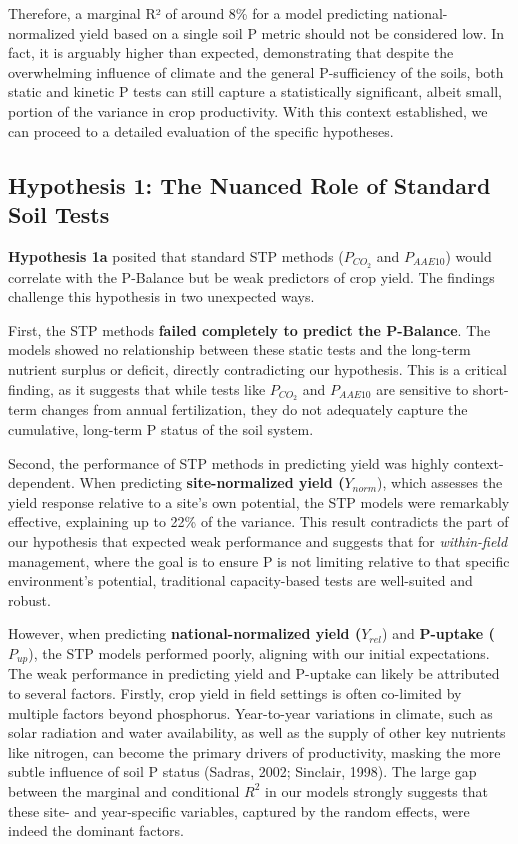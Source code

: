 \documentclass[
  a4paper,
]{article}
\begin{document}
Therefore, a marginal R² of around 8\% for a model predicting
national-normalized yield based on a single soil P metric should not be
considered low. In fact, it is arguably higher than expected,
demonstrating that despite the overwhelming influence of climate and the
general P-sufficiency of the soils, both static and kinetic P tests can
still capture a statistically significant, albeit small, portion of the
variance in crop productivity. With this context established, we can
proceed to a detailed evaluation of the specific hypotheses.

\subsection{Hypothesis 1: The Nuanced Role of Standard Soil
Tests}\label{hypothesis-1-the-nuanced-role-of-standard-soil-tests}

\textbf{Hypothesis 1a} posited that standard STP methods (\(P_{CO_2}\)
and \(P_{AAE10}\)) would correlate with the P-Balance but be weak
predictors of crop yield. The findings challenge this hypothesis in two
unexpected ways.

First, the STP methods \textbf{failed completely to predict the
P-Balance}. The models showed no relationship between these static tests
and the long-term nutrient surplus or deficit, directly contradicting
our hypothesis. This is a critical finding, as it suggests that while
tests like \(P_{CO_2}\) and \(P_{AAE10}\) are sensitive to short-term
changes from annual fertilization, they do not adequately capture the
cumulative, long-term P status of the soil system.

Second, the performance of STP methods in predicting yield was highly
context-dependent. When predicting \textbf{site-normalized yield
(}\(Y_{norm}\)), which assesses the yield response relative to a site's
own potential, the STP models were remarkably effective, explaining up
to 22\% of the variance. This result contradicts the part of our
hypothesis that expected weak performance and suggests that for
\emph{within-field} management, where the goal is to ensure P is not
limiting relative to that specific environment's potential, traditional
capacity-based tests are well-suited and robust.

However, when predicting \textbf{national-normalized yield
(}\(Y_{rel}\)) and \textbf{P-uptake (}\(P_{up}\)), the STP models
performed poorly, aligning with our initial expectations. The weak
performance in predicting yield and P-uptake can likely be attributed to
several factors. Firstly, crop yield in field settings is often
co-limited by multiple factors beyond phosphorus. Year-to-year
variations in climate, such as solar radiation and water availability,
as well as the supply of other key nutrients like nitrogen, can become
the primary drivers of productivity, masking the more subtle influence
of soil P status (Sadras, 2002; Sinclair, 1998). The large gap between
the marginal and conditional \(R^2\) in our models strongly suggests
that these site- and year-specific variables, captured by the random
effects, were indeed the dominant factors.
\end{document}
